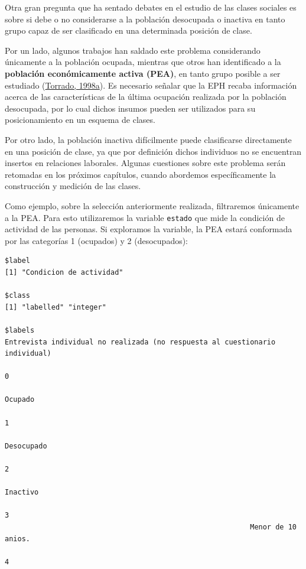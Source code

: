 \documentclass[
]{article}
\newenvironment{Shaded}{\begin{snugshade}}{\end{snugshade}}
\newcommand{\FunctionTok}[1]{\textcolor[rgb]{0.13,0.29,0.53}{\textbf{#1}}}
\newcommand{\NormalTok}[1]{#1}
\newcommand{\SpecialCharTok}[1]{\textcolor[rgb]{0.81,0.36,0.00}{\textbf{#1}}}
\begin{document}
Otra gran pregunta que ha sentado debates en el estudio de las clases sociales es sobre si debe o no considerarse a la población desocupada o inactiva en tanto grupo capaz de ser clasificado en una determinada posición de clase.

Por un lado, algunos trabajos han saldado este problema considerando únicamente a la población ocupada, mientras que otros han identificado a la \textbf{población económicamente activa (PEA)}, en tanto grupo posible a ser estudiado (\protect\hyperlink{ref-Torrado1998}{Torrado, 1998a}). Es necesario señalar que la EPH recaba información acerca de las características de la última ocupación realizada por la población desocupada, por lo cual dichos insumos pueden ser utilizados para su posicionamiento en un esquema de clases.

Por otro lado, la población inactiva difícilmente puede clasificarse directamente en una posición de clase, ya que por definición dichos individuos no se encuentran insertos en relaciones laborales. Algunas cuestiones sobre este problema serán retomadas en los próximos capítulos, cuando abordemos específicamente la construcción y medición de las clases.

Como ejemplo, sobre la selección anteriormente realizada, filtraremos únicamente a la PEA. Para esto utilizaremos la variable \texttt{estado} que mide la condición de actividad de las personas. Si exploramos la variable, la PEA estará conformada por las categorías 1 (ocupados) y 2 (desocupados):

\begin{Shaded}
\end{Shaded}

\begin{verbatim}
$label
[1] "Condicion de actividad"

$class
[1] "labelled" "integer" 

$labels
Entrevista individual no realizada (no respuesta al cuestionario individual) 
                                                                           0 
                                                                     Ocupado 
                                                                           1 
                                                                  Desocupado 
                                                                           2 
                                                                    Inactivo 
                                                                           3 
                                                          Menor de 10 anios. 
                                                                           4 
\end{verbatim}
\end{document}
